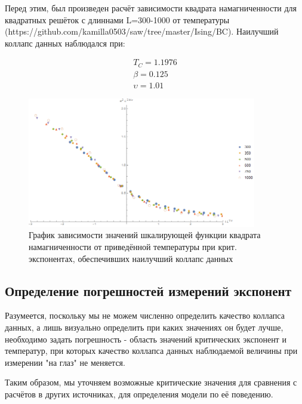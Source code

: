 Перед этим, был произведен расчёт зависимости квадрата намагниченности для квадратных решёток с длиннами L=300-1000 от температуры (https://github.com/kamilla0503/saw/tree/master/Ising/BC\cite{saw}). Наилучший коллапс данных наблюдался при:

\begin{align*}
    T_{C} = 1.1976 \\
    \beta = 0.125 \\
    \upsilon = 1.01
\end{align*}

\begin{figure}[!h]
    \centering
    \includegraphics[width=100mm]{Sections/Images/DatColMagn2_3.png}
    \caption{График зависимости значений шкалирующей функции квадрата намагниченности от приведённой температуры при крит. экспонентах, обеспечивших наилучший коллапс данных}
    \label{fig:DatColM2_3}
\end{figure}

\subsection{Определение погрешностей измерений экспонент}

Разумеется, поскольку мы не можем численно определить качество коллапса данных, а лишь визуально определить при каких значениях он будет лучше, необходимо задать погрешность - область значений критических экспонент и температур, при которых качество коллапса данных наблюдаемой величины при измерении "на глаз" не меняется.

Таким образом, мы уточняем возможные критические значения для сравнения с расчётов в других источниках, для определения модели по её поведению.

\newpage

